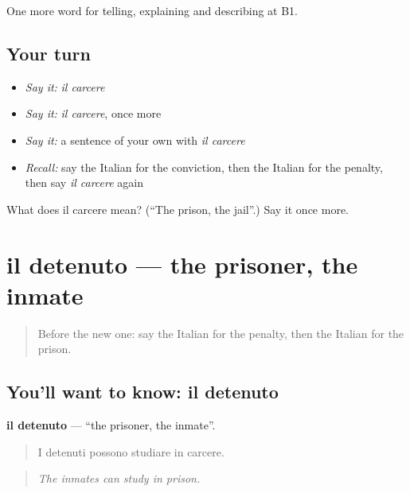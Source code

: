 \begin{grammarlens}[title={What you've built}]
One more word for telling, explaining and describing at B1.
\end{grammarlens}

\subsection*{Your turn}
\begin{itemize}
\raggedright
  \item \emph{Say it:} \emph{il carcere}
  \item \emph{Say it:} \emph{il carcere}, once more
  \item \emph{Say it:} a sentence of your own with \emph{il carcere}
  \item \emph{Recall:} say the Italian for the conviction, then the Italian for the penalty, then say \emph{il carcere} again
\end{itemize}

\begin{tcolorbox}[breakable,colback=teal!4,colframe=teal!35!black,title={Before you move on}]
What does il carcere mean? (\textquotedblleft{}The prison, the jail\textquotedblright{}.) Say it once more.
\end{tcolorbox}
\section[il detenuto]{il detenuto — the prisoner, the inmate}

\label{lesson:IT-C393-detenuto}



\begin{quote}
Before the new one: say the Italian for the penalty, then the Italian for the prison.
\end{quote}

\subsection*{You'll want to know: il detenuto}
\textbf{il detenuto} — \textquotedblleft{}the prisoner, the inmate\textquotedblright{}.

\begin{quote}
I detenuti possono studiare in carcere.
\end{quote}

\begin{quote}
\emph{The inmates can study in prison.}
\end{quote}

